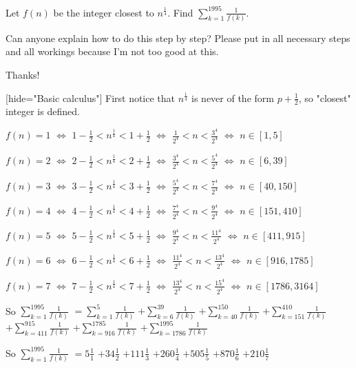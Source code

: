 \begin{solution}
	\begin{tcolorbox}Let $ f(n)$ be the integer closest to $ n^{\frac {1}{4}}$. Find $ \sum_{k = 1}^{1995} \frac {1}{f(k)}$.

Can anyone explain how to do this step by step? Please put in all necessary steps and all workings because I'm not too good at this.

Thanks!\end{tcolorbox}

[hide="Basic calculus"]
First notice that $ n^{\frac 14}$ is never of the form ${ p + \frac 12}$, so "closest" integer is defined.

$ f(n) = 1$ $ \iff$ $ 1 - \frac 12 < n^{\frac 14} < 1 + \frac 12$ $ \iff$ $ \frac 1{2^4} < n < \frac {3^4}{2^4}$ $ \iff$ $ n\in[1,5]$

$ f(n) = 2$ $ \iff$ $ 2 - \frac 12 < n^{\frac 14} < 2 + \frac 12$ $ \iff$ $ \frac {3^4}{2^4} < n < \frac {5^4}{2^4}$ $ \iff$ $ n\in[6,39]$

$ f(n) = 3$ $ \iff$ $ 3 - \frac 12 < n^{\frac 14} < 3 + \frac 12$ $ \iff$ $ \frac {5^4}{2^4} < n < \frac {7^4}{2^4}$ $ \iff$ $ n\in[40,150]$

$ f(n) = 4$ $ \iff$ $ 4 - \frac 12 < n^{\frac 14} < 4 + \frac 12$ $ \iff$ $ \frac {7^4}{2^4} < n < \frac {9^4}{2^4}$ $ \iff$ $ n\in[151,410]$

$ f(n) = 5$ $ \iff$ $ 5 - \frac 12 < n^{\frac 14} < 5 + \frac 12$ $ \iff$ $ \frac {9^4}{2^4} < n < \frac {11^4}{2^4}$ $ \iff$ $ n\in[411,915]$

$ f(n) = 6$ $ \iff$ $ 6 - \frac 12 < n^{\frac 14} < 6 + \frac 12$ $ \iff$ $ \frac {11^4}{2^4} < n < \frac {13^4}{2^4}$ $ \iff$ $ n\in[916,1785]$

$ f(n) = 7$ $ \iff$ $ 7 - \frac 12 < n^{\frac 14} < 7 + \frac 12$ $ \iff$ $ \frac {13^4}{2^4} < n < \frac {15^4}{2^4}$ $ \iff$ $ n\in[1786,3164]$

So $ \sum_{k = 1}^{1995}\frac 1{f(k)}$ $ = \sum_{k = 1}^{5}\frac 1{f(k)}$ $ + \sum_{k = 6}^{39}\frac 1{f(k)}$ $ + \sum_{k = 40}^{150}\frac 1{f(k)}$ $ + \sum_{k = 151}^{410}\frac 1{f(k)}$ $ + \sum_{k = 411}^{915}\frac 1{f(k)}$ $ + \sum_{k = 916}^{1785}\frac 1{f(k)}$ $ + \sum_{k = 1786}^{1995}\frac 1{f(k)}$

So $ \sum_{k = 1}^{1995}\frac 1{f(k)}$ $ = 5\frac 1{1}$ $ + 34\frac 1{2}$ $ + 111\frac 1{3}$ $ + 260\frac 1{4}$ $ + 505\frac 1{5}$ $ + 870\frac 1{6}$ $ + 210\frac 1{7}$


\end{solution}
